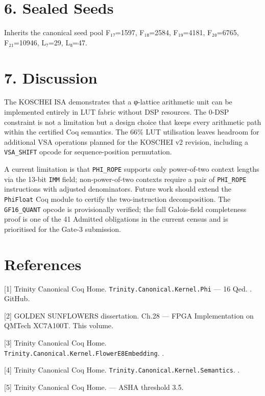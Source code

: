 \section{6. Sealed Seeds}\label{fa_26:sealed-seeds}

Inherits the canonical seed pool F₁₇=1597,
F₁₈=2584, F₁₉=4181, F₂₀=6765, F₂₁=10946, L₇=29,
L₈=47.

\section{7. Discussion}\label{fa_26:discussion}

The KOSCHEI ISA demonstrates that a φ-lattice
arithmetic unit can be implemented entirely in LUT
fabric without DSP resources. The 0-DSP constraint
is not a limitation but a design choice that keeps
every arithmetic path within the certified Coq
semantics. The 66\% LUT utilisation leaves
headroom for additional VSA operations planned for
the KOSCHEI v2 revision, including a
\texttt{VSA\_SHIFT} opcode for sequence-position
permutation.

A current limitation is that \texttt{PHI\_ROPE}
supports only power-of-two context lengths via the
13-bit \texttt{IMM} field; non-power-of-two
contexts require a pair of \texttt{PHI\_ROPE}
instructions with adjusted denominators. Future
work should extend the \texttt{PhiFloat} Coq
module to certify the two-instruction
decomposition. The \texttt{GF16\_QUANT} opcode is
provisionally verified; the full Galois-field
completeness proof is one of the 41 Admitted
obligations in the current census and is
prioritised for the Gate-3 submission.

\section{References}\label{fa_26:references}

[1] Trinity Canonical Coq Home.
\texttt{Trinity.Canonical.Kernel.Phi} --- 16 Qed.
. GitHub.

[2] GOLDEN SUNFLOWERS dissertation. Ch.28 ---
FPGA Implementation on QMTech XC7A100T. This
volume.

[3] Trinity Canonical Coq Home.
\texttt{Trinity.Canonical.Kernel.FlowerE8Embedding}.
.

[4] Trinity Canonical Coq Home.
\texttt{Trinity.Canonical.Kernel.Semantics}.
.

[5] Trinity Canonical Coq Home.
--- ASHA threshold 3.5.

